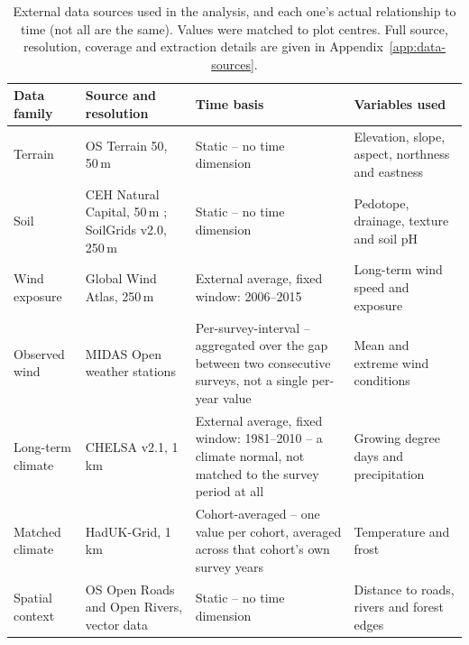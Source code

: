 \documentclass[logo,msc,ai]{infthesis}           %
\begin{document}
\begin{table}[!htbp]
\centering
\scriptsize
\setlength{\tabcolsep}{4pt}
\renewcommand{\arraystretch}{1.05}

\begin{tabular}{
    >{\raggedright\arraybackslash}p{2.0cm}
    >{\raggedright\arraybackslash}p{3.8cm}
    >{\raggedright\arraybackslash}p{3.0cm}
    >{\raggedright\arraybackslash}p{3.7cm}
}
\hline
Data family & Source and resolution & Time basis & Variables used \\
\hline

Terrain
& OS Terrain 50, 50\,m \cite{ordnancesurveyTerrain50_C3_LID}
& Static -- no time dimension
& Elevation, slope, aspect, northness and eastness \\

Soil
& CEH Natural Capital, 50\,m \cite{feeney2026CEHNaturalCapital_C3_LID}; SoilGrids v2.0, 250\,m \cite{poggio2021SoilGrids_C3_LID}
& Static -- no time dimension
& Pedotope, drainage, texture and soil pH \\

Wind exposure
& Global Wind Atlas, 250\,m \cite{davis2023GlobalWindAtlas_C3_LID}
& External average, fixed window: 2006--2015
& Long-term wind speed and exposure \\

Observed wind
& MIDAS Open weather stations \cite{metoffice2019MIDASOpen_C3_LID}
& Per-survey-interval -- aggregated over the gap between two consecutive surveys, not a single
per-year value
& Mean and extreme wind conditions \\

Long-term climate
& CHELSA v2.1, 1\,km \cite{karger2017CHELSA_C3_LID}
& External average, fixed window: 1981--2010 -- a climate normal, not matched to the survey
period at all
& Growing degree days and precipitation \\

Matched climate
& HadUK-Grid, 1\,km \cite{hollis2019HadUKGrid_C3_LID}
& Cohort-averaged -- one value per cohort, averaged across that cohort's own survey years
& Temperature and frost \\

Spatial context
& OS Open Roads and Open Rivers, vector data
\cite{ordnancesurveyOpenRoads_C3_LID,ordnancesurveyOpenRivers_C3_LID}
& Static -- no time dimension
& Distance to roads, rivers and forest edges \\

\hline
\end{tabular}

\caption{\small{External data sources used in the analysis, and each one's actual relationship
to time (not all are the same). Values were matched to plot centres. Full source, resolution,
coverage and extraction details are given in Appendix~\ref{app:data-sources}.}}
\label{tab:data-env-sources}
\end{table}
\end{document}
